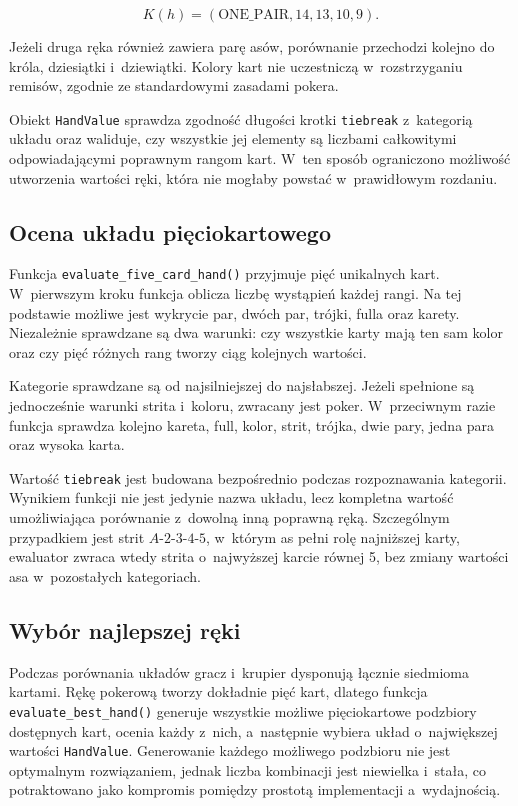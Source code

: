 \begin{equation}
    K(h) =
    \left(
        \text{ONE\_PAIR},
        14,
        13,
        10,
        9
    \right).
\end{equation}

Jeżeli druga ręka również zawiera parę asów, porównanie przechodzi kolejno
do króla, dziesiątki i~dziewiątki. Kolory kart nie uczestniczą w~rozstrzyganiu
remisów, zgodnie ze standardowymi zasadami pokera.

Obiekt \texttt{HandValue} sprawdza zgodność długości krotki
\texttt{tiebreak} z~kategorią układu oraz waliduje, czy wszystkie
jej elementy są liczbami całkowitymi odpowiadającymi poprawnym rangom kart.
W~ten sposób ograniczono możliwość utworzenia wartości ręki, która nie mogłaby powstać
w~prawidłowym rozdaniu.

\subsection{Ocena układu pięciokartowego}
\label{subsec:ocena-pieciu-kart}

Funkcja \texttt{evaluate\_five\_card\_hand()} przyjmuje pięć
unikalnych kart. W~pierwszym kroku funkcja oblicza liczbę wystąpień każdej rangi. Na tej
podstawie możliwe jest wykrycie par, dwóch par, trójki, fulla oraz karety.
Niezależnie sprawdzane są dwa warunki: czy wszystkie karty mają ten sam
kolor oraz czy pięć różnych rang tworzy ciąg kolejnych wartości.

Kategorie sprawdzane są od najsilniejszej do najsłabszej. Jeżeli spełnione
są jednocześnie warunki strita i~koloru, zwracany jest poker. W~przeciwnym
razie funkcja sprawdza kolejno kareta, full, kolor, strit, trójka, dwie pary,
jedna para oraz wysoka karta.

Wartość \texttt{tiebreak} jest budowana bezpośrednio podczas rozpoznawania
kategorii. Wynikiem funkcji nie jest jedynie nazwa układu, lecz kompletna
wartość umożliwiająca porównanie z~dowolną inną poprawną ręką. Szczególnym
przypadkiem jest strit \(A\)-\(2\)-\(3\)-\(4\)-\(5\), w~którym as pełni rolę
najniższej karty, ewaluator zwraca wtedy strita o~najwyższej karcie równej 5,
bez zmiany wartości asa w~pozostałych kategoriach.

\subsection{Wybór najlepszej ręki}
\label{subsec:wybor-najlepszej-reki}

Podczas porównania układów gracz i~krupier dysponują łącznie siedmioma kartami.
Rękę pokerową tworzy dokładnie pięć kart, dlatego funkcja \texttt{evaluate\_best\_hand()}
generuje wszystkie możliwe pięciokartowe podzbiory dostępnych kart, ocenia
każdy z~nich, a~następnie wybiera układ o~największej wartości \texttt{HandValue}.
Generowanie każdego możliwego podzbioru nie jest optymalnym rozwiązaniem,
jednak liczba kombinacji jest niewielka i~stała, co potraktowano jako kompromis pomiędzy prostotą implementacji a~wydajnością.


